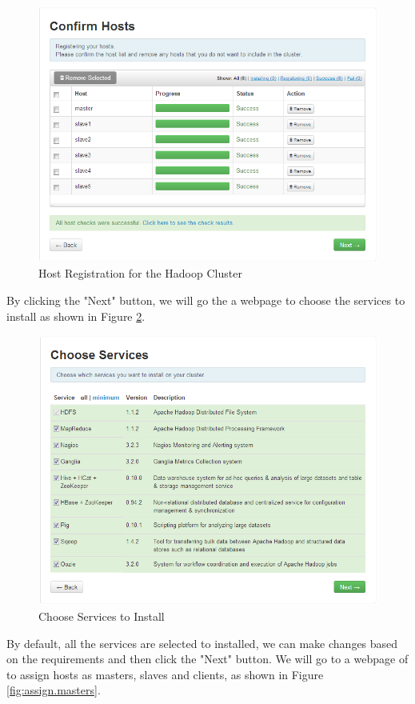 \begin{figure}[ht]
  \centering
  \includegraphics[width=.8\textwidth]{figs/5163os_06_17.png}
  \caption{Host Registration for the Hadoop Cluster}\label{fig:host.registration}
\end{figure} 
By clicking the "Next" button, we will go the a webpage to choose the services to install as shown in Figure \ref{fig:choose.services}.
\begin{figure}[ht]
  \centering
  \includegraphics[width=.8\textwidth]{figs/5163os_06_18.png}
  \caption{Choose Services to Install}\label{fig:choose.services}
\end{figure} 
By default, all the services are selected to installed, we can make changes based on the requirements and then click the "Next" button. We will go to a webpage of to assign hosts as masters, slaves and clients, as shown in Figure \ref{fig:assign.masters}.
